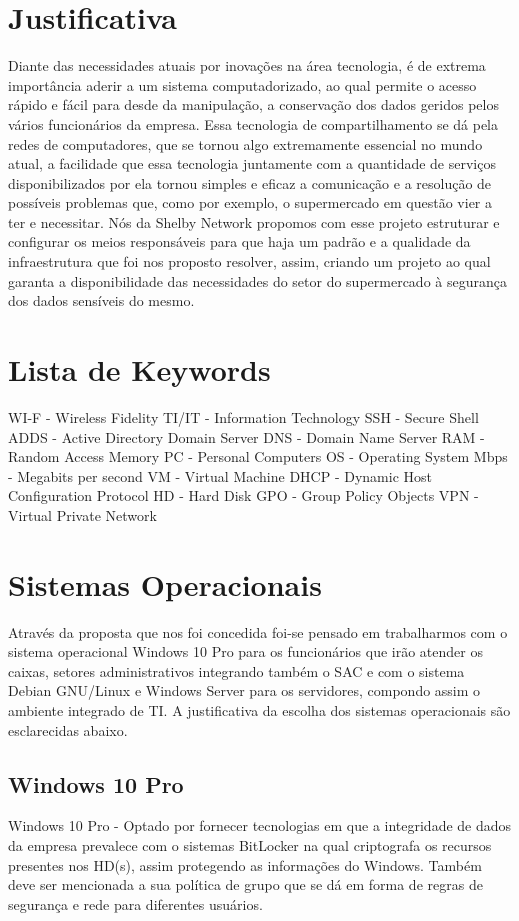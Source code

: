 \documentclass[12pt]{article}
\begin{document}
\section{Justificativa}
Diante das necessidades atuais por inovações na área tecnologia, é de extrema importância aderir a um sistema computadorizado, ao qual permite o acesso rápido e fácil para desde da manipulação, a conservação dos dados geridos pelos vários funcionários da empresa. Essa tecnologia de compartilhamento se dá pela redes de computadores, que se tornou algo extremamente essencial no mundo atual, a facilidade que essa tecnologia juntamente com a quantidade de serviços disponibilizados por ela tornou simples e eficaz a comunicação e a resolução de possíveis problemas que, como por exemplo, o supermercado em questão vier a ter e necessitar. Nós da Shelby Network propomos com esse projeto estruturar e configurar os meios responsáveis para que haja um padrão e a qualidade da infraestrutura que foi nos proposto resolver, assim, criando um projeto ao qual garanta a disponibilidade das necessidades do setor do supermercado à segurança dos dados sensíveis do mesmo.
\section{Lista de Keywords}
WI-F - Wireless Fidelity
TI/IT - Information Technology
SSH - Secure Shell
ADDS - Active Directory Domain Server
DNS - Domain Name Server
RAM - Random Access Memory
PC - Personal Computers
OS - Operating System
Mbps - Megabits per second
VM - Virtual Machine
DHCP - Dynamic Host Configuration Protocol
HD - Hard Disk
GPO - Group Policy Objects
VPN - Virtual Private Network
\section{Sistemas Operacionais}
Através da proposta que nos foi concedida foi-se pensado em trabalharmos com o sistema operacional Windows 10 Pro para os funcionários que irão atender os caixas, setores administrativos integrando também o SAC e com o sistema Debian  GNU/Linux e Windows Server para os servidores, compondo assim o ambiente integrado de TI. A justificativa da escolha dos sistemas operacionais são esclarecidas abaixo.
\subsection{Windows 10 Pro}
Windows 10 Pro - Optado por fornecer tecnologias em que a integridade de dados da empresa prevalece com o sistemas  BitLocker  na qual criptografa os recursos presentes nos HD(s), assim protegendo as informações do Windows. Também deve ser mencionada a sua política de grupo que se dá em forma de regras de segurança e rede para diferentes usuários.
\end{document}
